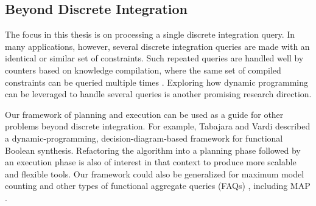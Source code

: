 
\subsection{Beyond Discrete Integration}
The focus in this thesis is on processing a single discrete integration query. 
In many applications, however, several discrete integration queries are made with an identical or similar set of constraints.
Such repeated queries are handled well by counters based on knowledge compilation, where the same set of compiled constraints can be queried multiple times \cite{koriche2013knowledge,LM17,darwiche2004new,OD15}.
Exploring how dynamic programming can be leveraged to handle several queries is another promising research direction.

Our framework of planning and execution can be used as a guide for other problems beyond discrete integration.
For example, Tabajara and Vardi \cite{tabajara2017factored} described a dynamic-programming, decision-diagram-based framework for functional Boolean synthesis.
Refactoring the algorithm into a planning phase followed by an execution phase is also of interest in that context to produce more scalable and flexible tools.
Our framework could also be generalized for maximum model counting \cite{fremont2017maximum} and other types of functional aggregate queries (FAQs) \cite{KNR16}, including MAP \cite{murphy2012machine,maua2015complexity,xue2016solving}.

